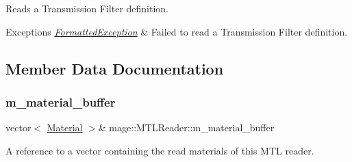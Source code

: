 Reads a Transmission Filter definition.


\begin{DoxyExceptions}{Exceptions}
{\em \hyperlink{structmage_1_1_formatted_exception}{Formatted\+Exception}} & Failed to read a Transmission Filter definition. \\
\hline
\end{DoxyExceptions}


\subsection{Member Data Documentation}
\hypertarget{classmage_1_1_m_t_l_reader_a6382e0e9fce6581b129d18f5d82994c2}{}\label{classmage_1_1_m_t_l_reader_a6382e0e9fce6581b129d18f5d82994c2} 
\subsubsection{\texorpdfstring{m\+\_\+material\+\_\+buffer}{m\_material\_buffer}}
{\footnotesize\ttfamily vector$<$ \hyperlink{structmage_1_1_material}{Material} $>$\& mage\+::\+M\+T\+L\+Reader\+::m\+\_\+material\+\_\+buffer\hspace{0.3cm}{\ttfamily [private]}}

A reference to a vector containing the read materials of this M\+TL reader. 